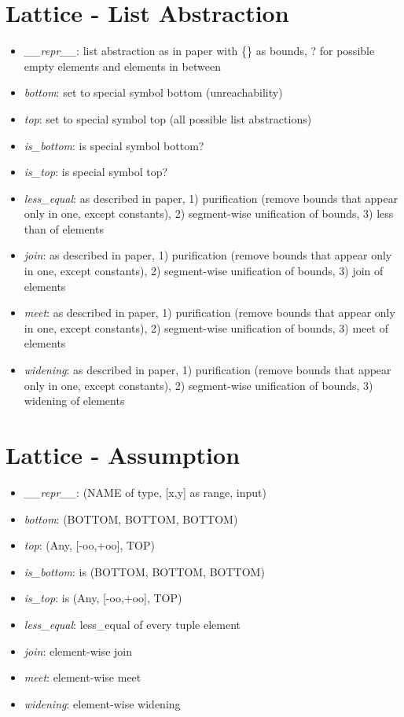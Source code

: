 \documentclass[11pt]{article}
\begin{document}
\section{Lattice - List Abstraction}

\begin{itemize}
\item \textit{\_\_repr\_\_}: list abstraction as in paper with \{\} as bounds, ? for possible empty elements and elements in between
\item \textit{bottom}: set to special symbol bottom (unreachability)
\item \textit{top}: set to special symbol top (all possible list abstractions)
\item \textit{is\_bottom}: is special symbol bottom?
\item \textit{is\_top}: is special symbol top?
\item \textit{less\_equal}: as described in paper, 1) purification (remove bounds that appear only in one, except constants), 2) segment-wise unification of bounds, 3) less than of elements
\item \textit{join}: as described in paper, 1) purification (remove bounds that appear only in one, except constants), 2) segment-wise unification of bounds, 3) join of elements
\item \textit{meet}: as described in paper, 1) purification (remove bounds that appear only in one, except constants), 2) segment-wise unification of bounds, 3) meet of elements
\item \textit{widening}: as described in paper, 1) purification (remove bounds that appear only in one, except constants), 2) segment-wise unification of bounds, 3) widening of elements
\end{itemize}

\section{Lattice - Assumption}

\begin{itemize}
\item \textit{\_\_repr\_\_}: (NAME of type, [x,y] as range, input)
\item \textit{bottom}: (BOTTOM, BOTTOM, BOTTOM)
\item \textit{top}: (Any, [-oo,+oo], TOP)
\item \textit{is\_bottom}: is (BOTTOM, BOTTOM, BOTTOM)
\item \textit{is\_top}: is (Any, [-oo,+oo], TOP)
\item \textit{less\_equal}: less\_equal of every tuple element
\item \textit{join}: element-wise join
\item \textit{meet}: element-wise meet
\item \textit{widening}: element-wise widening
\end{itemize}
\end{document}
